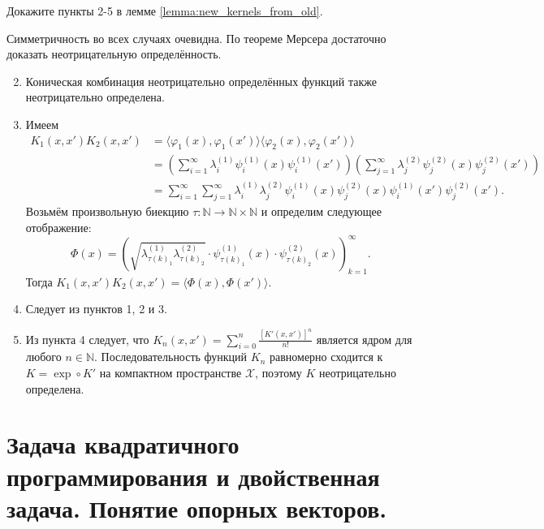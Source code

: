 \begin{problem}
Докажите пункты 2-5 в лемме \ref{lemma:new_kernels_from_old}.
\end{problem}
\begin{solution}
    Симметричность во всех случаях очевидна. По теореме Мерсера достаточно доказать неотрицательную определённость.
    \begin{enumerate}
        \setcounter{enumi}{1}
        \item Коническая комбинация неотрицательно определённых функций также неотрицательно определена.
        \item Имеем
              \begin{align*}
                  K_1(x, x') K_2(x, x') & = \langle \varphi_1(x), \varphi_1(x') \rangle \langle \varphi_2(x), \varphi_2(x') \rangle                                                                           \\
                                        & = \left( \sum_{i=1}^\infty \lambda_i^{(1)} \psi_i^{(1)}(x)\psi_i^{(1)}(x') \right) \left( \sum_{j=1}^\infty \lambda_j^{(2)} \psi_j^{(2)}(x)\psi_j^{(2)}(x') \right) \\
                                        & = \sum_{i=1}^\infty \sum_{j=1}^\infty \lambda_i^{(1)} \lambda_j^{(2)} \psi_i^{(1)}(x) \psi_j^{(2)}(x) \psi_i^{(1)}(x') \psi_j^{(2)}(x').
              \end{align*}
              Возьмём произвольную биекцию $\tau \colon \mathbb{N} \to \mathbb{N} \times \mathbb{N}$ и определим следующее отображение:
              \[ \varPhi(x) = \left(\sqrt{\lambda^{(1)}_{\tau(k)_1} \lambda^{(2)}_{\tau(k)_2}} \cdot \psi_{\tau(k)_1}^{(1)}(x) \cdot \psi_{\tau(k)_2}^{(2)}(x)\right)_{k=1}^\infty. \]
              Тогда $K_1(x, x') K_2(x, x') = \langle \varPhi(x), \varPhi(x') \rangle$.
        \item Следует из пунктов 1, 2 и 3.
        \item Из пункта 4 следует, что $K_n(x, x') = \sum_{i=0}^n \frac{[K'(x, x')]^n}{n!}$ является ядром для любого $n \in \mathbb{N}$. Последовательность функций $K_n$ равномерно сходится к $K = \exp \circ K'$ на компактном пространстве $\mathcal{X}$, поэтому $K$ неотрицательно определена.
    \end{enumerate}
\end{solution}

\section{Задача квадратичного программирования и двойственная задача. Понятие опорных векторов.}

